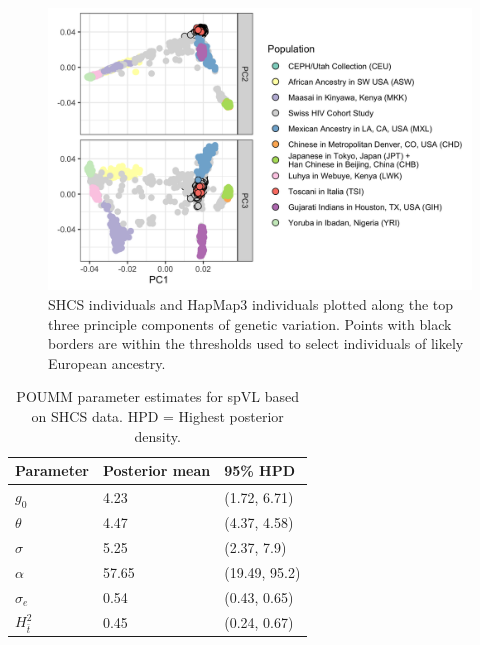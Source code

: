 \documentclass[11pt]{article}
\begin{document}
\begin{doublespace}
\begin{figure}[H]
	\includegraphics[width=\linewidth]{figures/host_genotype_pca.png}
	\caption{SHCS individuals and HapMap3 individuals plotted along the top three principle components of genetic variation. Points with black borders are within the thresholds used to select individuals of likely European ancestry.}
	\label{fig:PCA}
\end{figure}

\end{doublespace}  %

\newpage

\begin{table}[H]
\caption{POUMM parameter estimates for spVL based on SHCS data. HPD = Highest posterior density.}
	\begin{tabularx}{\linewidth}{XXX} \hline 
	Parameter & Posterior mean & 95\% HPD \\ \hline 
	${g_{0}}$ & 4.23 & (1.72, 6.71) \\
	$\theta$ & 4.47 & (4.37, 4.58) \\
	$\sigma$ & 5.25 & (2.37, 7.9) \\
	$\alpha$ & 57.65 & (19.49, 95.2) \\
	$\sigma_e$ & 0.54 & (0.43, 0.65) \\ 
	$H^2_{\bar{t}}$ & 0.45 & (0.24, 0.67) \\ \hline
	\end{tabularx}
	\label{tab:POUMM-parameters-our-estimates}
\end{table}
\end{document}

